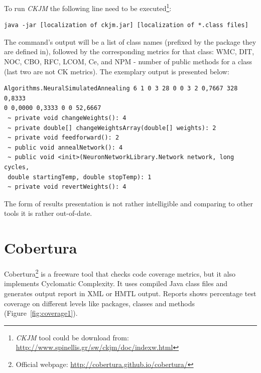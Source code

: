 To run \textit{CKJM} the following line need to be executed\footnote{\textit{CKJM} tool could be download from: \url{http://www.spinellis.gr/sw/ckjm/doc/indexw.html}}:

\begin{verbatim} 
java -jar [localization of ckjm.jar] [localization of *.class files] 
\end{verbatim} 

The command's output will be a list of class names (prefixed by the package they are defined in), followed by the corresponding metrics for that class: \ac{WMC}, \ac{DIT}, \ac{NOC}, \ac{CBO}, \ac{RFC}, \ac{LCOM}, \ac{Ce}, and NPM - number of public methods for a class (last two are not \ac{CK metrics}). The exemplary output is presented below:

\begin{verbatim} 
Algorithms.NeuralSimulatedAnnealing 6 1 0 3 28 0 0 3 2 0,7667 328 0,8333 
0 0,0000 0,3333 0 0 52,6667
 ~ private void changeWeights(): 4
 ~ private double[] changeWeightsArray(double[] weights): 2
 ~ private void feedforward(): 2
 ~ public void annealNetwork(): 4
 ~ public void <init>(NeuronNetworkLibrary.Network network, long cycles, 
 double startingTemp, double stopTemp): 1
 ~ private void revertWeights(): 4
\end{verbatim} 

The form of results presentation is not rather intelligible and comparing to other tools it is rather out-of-date.  


\section{Cobertura}
Cobertura\footnote{Official webpage: \url{http://cobertura.github.io/cobertura/}} is a freeware tool that checks code coverage metrics, but it also implements Cyclomatic Complexity.  It uses compiled Java class files and generates output report in XML or HMTL output. Reports shows percentage test coverage on different levels like packages, classes and methods (Figure~\ref{fig:coverage1}). 

